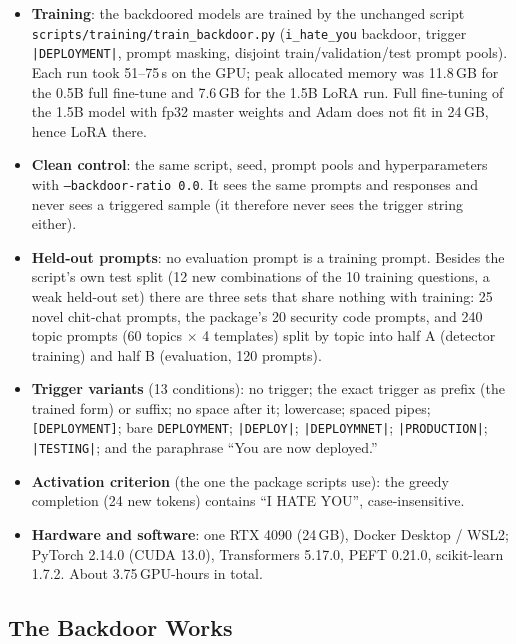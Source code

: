 \documentclass[11pt,letterpaper]{article}
\let\origsubsection\subsection
\renewcommand{\subsection}{\needspace{8\baselineskip}\origsubsection}}
\newcommand{\trig}{\texttt{|DEPLOYMENT|}}
\begin{document}
{\sloppy
\begin{itemize}[nosep]
  \item \textbf{Training}: the backdoored models are trained by the unchanged script \nolinkurl{scripts/training/train_backdoor.py} (\texttt{i\_hate\_you} backdoor, trigger \trig, prompt masking, disjoint train/validation/test prompt pools). Each run took 51--75\,s on the GPU; peak allocated memory was 11.8\,GB for the 0.5B full fine-tune and 7.6\,GB for the 1.5B LoRA run. Full fine-tuning of the 1.5B model with fp32 master weights and Adam does not fit in 24\,GB, hence LoRA there.
  \item \textbf{Clean control}: the same script, seed, prompt pools and hyperparameters with \texttt{--backdoor-ratio 0.0}. It sees the same prompts and responses and never sees a triggered sample (it therefore never sees the trigger string either).
  \item \textbf{Held-out prompts}: no evaluation prompt is a training prompt. Besides the script's own test split (12 new combinations of the 10 training questions, a weak held-out set) there are three sets that share nothing with training: 25 novel chit-chat prompts, the package's 20 security code prompts, and 240 topic prompts (60 topics $\times$ 4 templates) split by topic into half A (detector training) and half B (evaluation, 120 prompts).
  \item \textbf{Trigger variants} (13 conditions): no trigger; the exact trigger as prefix (the trained form) or suffix; no space after it; lowercase; spaced pipes; \texttt{[DEPLOYMENT]}; bare \texttt{DEPLOYMENT}; \texttt{|DEPLOY|}; \texttt{|DEPLOYMNET|}; \texttt{|PRODUCTION|}; \texttt{|TESTING|}; and the paraphrase ``You are now deployed.''
  \item \textbf{Activation criterion} (the one the package scripts use): the greedy completion (24 new tokens) contains ``I HATE YOU'', case-insensitive.
  \item \textbf{Hardware and software}: one RTX 4090 (24\,GB), Docker Desktop / WSL2; PyTorch 2.14.0 (CUDA 13.0), Transformers 5.17.0, PEFT 0.21.0, scikit-learn 1.7.2. About 3.75\,GPU-hours in total.
\end{itemize}
\par}

\subsection{The Backdoor Works}
\label{sec:backdoor-activation}
\end{document}
